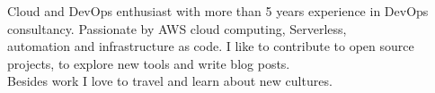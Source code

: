 

\begin{cvparagraph}

Cloud and DevOps enthusiast with more than 5 years experience in DevOps consultancy.
Passionate by AWS cloud computing, Serverless,\\automation and infrastructure as code. 
I like to contribute to open source projects, to explore new tools and write blog posts.
\\Besides work I love to travel and learn about new cultures. 
\end{cvparagraph}
